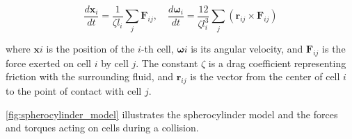 \documentclass[conference]{IEEEtran}
\begin{document}
\begin{equation} \label{eq:overdamped_langevin}
    \frac{d \mathbf{x}_i}{dt} = \frac{1}{\zeta l_i} \sum_j \mathbf{F}_{ij}, \quad \frac{d \boldsymbol{\omega}_i}{dt} = \frac{12}{\zeta l_i^3} \sum_j (\mathbf{r}_{ij} \times \mathbf{F}_{ij})
\end{equation}

where $\mathbf{x}i$ is the position of the $i$-th cell, $\boldsymbol{\omega}i$ is its angular velocity, and $\mathbf{F}_{ij}$ is the force exerted on cell $i$ by cell $j$. The constant $\zeta$ is a drag coefficient representing friction with the surrounding fluid, and $\mathbf{r}_{ij}$ is the vector from the center of cell $i$ to the point of contact with cell $j$.

\autoref{fig:spherocylinder_model} illustrates the spherocylinder model and the forces and torques acting on cells during a collision.
\end{document}
